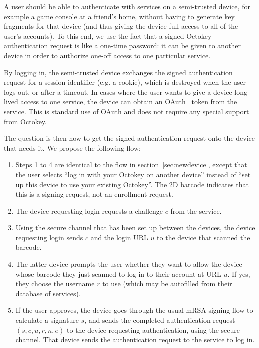 A user should be able to authenticate with services on a semi-trusted device, for example a game
console at a friend's home, without having to generate key fragments for that device (and thus
giving the device full access to all of the user's accounts). To this end, we use the fact that a
signed Octokey authentication request is like a one-time password: it can be given to another device
in order to authorize one-off access to one particular service.

By logging in, the semi-trusted device exchanges the signed authentication request for a session
identifier (e.g. a cookie), which is destroyed when the user logs out, or after a timeout. In cases
where the user wants to give a device long-lived access to one service, the device can obtain an
OAuth~\cite{OAuth} token from the service. This is standard use of OAuth and does not require any
special support from Octokey.

The question is then how to get the signed authentication request onto the device that needs it. We
propose the following flow:

\begin{enumerate}
\item Steps 1 to 4 are identical to the flow in section~\ref{sec:newdevice}, except that the user
selects ``log in with your Octokey on another device'' instead of ``set up this device to use your
existing Octokey''. The 2D barcode indicates that this is a signing request, not an enrollment
request.
\item The device requesting login requests a challenge $c$ from the service.
\item Using the secure channel that has been set up between the devices, the device requesting login
sends $c$ and the login URL $u$ to the device that scanned the barcode.
\item The latter device prompts the user whether they want to allow the device whose barcode they
just scanned to log in to their account at URL $u$. If yes, they choose the username $r$ to use
(which may be autofilled from their database of services).
\item If the user approves, the device goes through the usual mRSA signing flow to calculate a
signature $s$, and sends the completed authentication request $(s, c, u, r, n, e)$ to the device
requesting authentication, using the secure channel. That device sends the authentication request to
the service to log in.
\end{enumerate}

